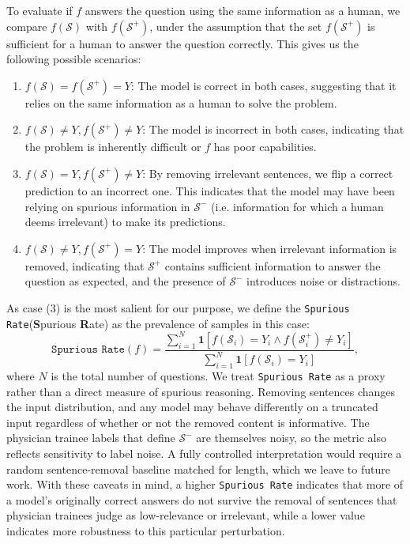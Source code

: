 \documentclass[fleqn,10pt]{wlscirep}
\def\ourmetric{\texttt{Spurious Rate}\xspace}
\begin{document}
To evaluate if $f$ answers the question using the same information as a human, we compare $f(\mathcal{S})$ with $f(\mathcal{S}^+)$, under the assumption that the set $f(\mathcal{S}^+)$ is sufficient for a human to answer the question correctly. This gives us the following possible scenarios:
\begin{enumerate}
 \item $f(\mathcal{S}) = f(\mathcal{S}^+) = Y$: The model is correct in both cases, suggesting that it relies on the same information as a human to solve the problem.
    \item $f(\mathcal{S}) \neq Y,  f(\mathcal{S}^+) \neq Y$: The model is incorrect in both cases, indicating that the problem is inherently difficult or $f$ has poor capabilities.
     \item $f(\mathcal{S}) = Y,  f(\mathcal{S}^+) \neq Y$: By removing irrelevant sentences, we flip a correct prediction to an incorrect one. This indicates that the model may have been relying on spurious information in $\mathcal{S}^-$ (i.e. information for which a human deems irrelevant) to make its predictions. 
      \item $f(\mathcal{S}) \neq Y, f(\mathcal{S}^+) = Y$: The model improves when irrelevant information is removed, indicating that $\mathcal{S}^+$ contains sufficient information to answer the question as expected, and the presence of $\mathcal{S}^-$ introduces noise or distractions.
\end{enumerate}

As case (3) is the most salient for our purpose, we define the \ourmetric (\textbf{S}purious \textbf{R}ate) as the prevalence of samples in this case:
$$\ourmetric(f) = \frac{\sum_{i=1}^N \mathbf{1}[f(\mathcal{S}_i) = Y_i \land f(\mathcal{S}_i^+) \neq Y_i]}{\sum_{i=1}^N \mathbf{1}[f(\mathcal{S}_i) = Y_i]},$$
where $N$ is the total number of questions. We treat \ourmetric as a proxy rather than a direct measure of spurious reasoning. Removing sentences changes the input distribution, and any model may behave differently on a truncated input regardless of whether or not the removed content is informative. The physician trainee labels that define $\mathcal{S}^-$ are themselves noisy, so the metric also reflects sensitivity to label noise. A fully controlled interpretation would require a random sentence-removal baseline matched for length, which we leave to future work. With these caveats in mind, a higher \ourmetric indicates that more of a model's originally correct answers do not survive the removal of sentences that physician trainees judge as low-relevance or irrelevant, while a lower value indicates more robustness to this particular perturbation.
\end{document}
